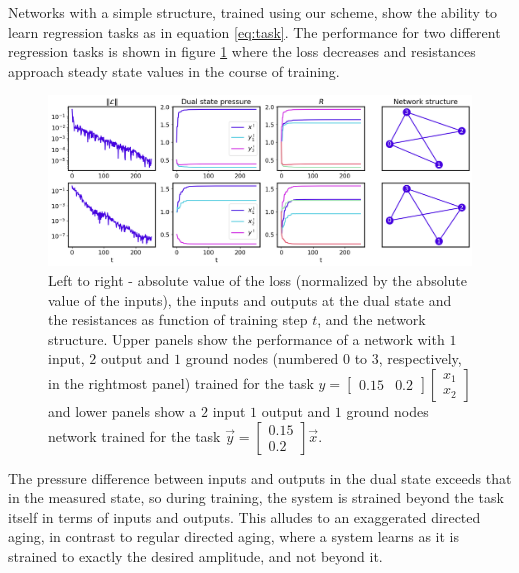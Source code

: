 \documentclass[%
 reprint,
 amsmath,amssymb,
 aps,
]{revtex4-2}
\begin{document}
{    %
    Networks with a simple structure, trained using our scheme, show the ability to learn regression tasks as in equation \ref{eq:task}. The performance for two different regression tasks is shown in figure \ref{fig:variabs_in_t} where the loss decreases and resistances approach steady state values in the course of training. 
    \begin{figure}[ht]
    \centerline{
    \includegraphics[width=\textwidth,height=\textheight,keepaspectratio]{Figures/performance_2_examples_4panels_mycolors.png}
    }
    \caption{Left to right - absolute value of the loss (normalized by the absolute value of the inputs), the inputs and outputs at the dual state and the resistances as function of training step $t$, and the network structure. Upper panels show the performance of a network with $1$ input, $2$ output and $1$ ground nodes (numbered $0$ to $3$, respectively, in the rightmost panel) trained for the task $y=\left[\begin{array}{cc}0.15 & 0.2\end{array}\right]\left[\begin{array}{c} x_{1}\\x_{2}\end{array}\right]$ and lower panels show a $2$ input $1$ output and $1$ ground nodes network trained for the task $\vec{y}=\left[\begin{array}{c}0.15\\0.2\end{array}\right]\vec{x}$.}
    \label{fig:variabs_in_t}
    \end{figure}
    The pressure difference between inputs and outputs in the dual state exceeds that in the measured state, so during training, the system is strained beyond the task itself in terms of inputs and outputs. This alludes to an exaggerated directed aging, in contrast to regular directed aging, where a system learns as it is strained to exactly the desired amplitude, and not beyond it.

}
\end{document}
